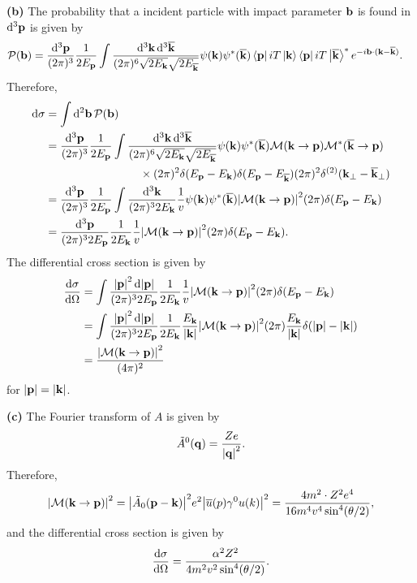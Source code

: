\documentclass{article}
\makeatletter
\newcommand*{\shifttext}[1]{%
  \settowidth{\@tempdima}{#1}%
  \hspace{-\@tempdima}#1%
}
\newcommand{\plabel}[1]{%
\shifttext{\textbf{#1}\quad}%
}
\makeatother
\begin{document}
\plabel{(b)}%
The probability that a incident particle with impact parameter $\vb{b}$ is found in $\dd[3]{\vb{p}}$ is given by
\begin{align*}
    \mathcal{P}(\vb{b}) &= \frac{\dd[3]{\vb{p}}}{(2\pi)^3} \frac{1}{2E_{\vb{p}}} \int \frac{\dd[3]{\vb{k}}\dd[3]{\overline{\vb{k}}}}{(2\pi)^6 \sqrt{2E_{\vb{k}}}\sqrt{2E_{\overline{\vb{k}}}}} \psi(\vb{k}) \psi^*(\overline{\vb{k}}) \bra{\vb{p}} iT \ket{\vb{k}} \bra{\vb{p}} iT \ket{\overline{\vb{k}}}^* e^{-i\vb{b}\cdot (\vb{k} - \overline{\vb{k}})}. 
\end{align*}
Therefore,
\begin{align*}
    \dd{\sigma} &= \int \dd[2]{\vb{b}} \mathcal{P}(\vb{b}) \\
    &= \frac{\dd[3]{\vb{p}}}{(2\pi)^3} \frac{1}{2E_{\vb{p}}} \int \frac{\dd[3]{\vb{k}}\dd[3]{\overline{\vb{k}}}}{(2\pi)^6 \sqrt{2E_{\vb{k}}}\sqrt{2E_{\overline{\vb{k}}}}} \psi(\vb{k}) \psi^*(\overline{\vb{k}}) \mathcal{M}(\vb{k}\rightarrow \vb{p}) \mathcal{M}^*(\overline{\vb{k}}\rightarrow \vb{p}) \\
    &\phantom{{}={}} \hspace{7em} \times (2\pi)^2 \delta(E_{\vb{p}} - E_{\vb{k}}) \delta(E_{\vb{p}} - E_{\overline{\vb{k}}}) (2\pi)^2 \delta^{(2)}(\vb{k}_\perp - \overline{\vb{k}}_\perp) \\
    &= \frac{\dd[3]{\vb{p}}}{(2\pi)^3} \frac{1}{2E_{\vb{p}}} \int \frac{\dd[3]{\vb{k}}}{(2\pi)^3 2 E_{\vb{k}}} \frac{1}{v} \psi(\vb{k}) \psi^*(\overline{\vb{k}}) \abs{\mathcal{M}(\vb{k}\rightarrow \vb{p})}^2 (2\pi) \delta(E_{\vb{p}} - E_{\vb{k}}) \\
    &= \frac{\dd[3]{\vb{p}}}{(2\pi)^3 2E_{\vb{p}}} \frac{1}{2E_{\vb{k}}} \frac{1}{v} \abs{\mathcal{M}(\vb{k}\rightarrow \vb{p})}^2 (2\pi) \delta(E_{\vb{p}} - E_{\vb{k}}).
\end{align*}
The differential cross section is given by
\begin{align*}
    \dv{\sigma}{\Omega} &= \int \frac{\abs{\vb{p}}^2 \dd{\abs{\vb{p}}}}{(2\pi)^3 2E_{\vb{p}}} \frac{1}{2E_{\vb{k}}} \frac{1}{v} \abs{\mathcal{M}(\vb{k}\rightarrow \vb{p})}^2 (2\pi) \delta(E_{\vb{p}} - E_{\vb{k}}) \\
    &= \int \frac{\abs{\vb{p}}^2 \dd{\abs{\vb{p}}}}{(2\pi)^3 2E_{\vb{p}}} \frac{1}{2E_{\vb{k}}} \frac{E_{\vb{k}}}{\abs{\vb{k}}} \abs{\mathcal{M}(\vb{k}\rightarrow \vb{p})}^2 (2\pi) \frac{E_{\vb{k}}}{\abs{\vb{k}}} \delta(\abs{\vb{p}} - \abs{\vb{k}}) \\
    &= \frac{\abs{\mathcal{M}(\vb{k}\rightarrow\vb{p})}^2}{(4\pi)^2}
\end{align*}
for $\abs{\vb{p}} = \abs{\vb{k}}$.

\plabel{(c)}%
The Fourier transform of $A$ is given by
\[ \tilde{A}^0(\vb{q}) = \frac{Z e}{\abs{\vb{q}}^2}. \]
Therefore,
\[ \abs{\mathcal{M}(\vb{k}\rightarrow\vb{p})}^2 = \abs{\tilde{A}_0(\vb{p} - \vb{k})}^2 e^2 \abs{\overline{u}(p) \gamma^0 u(k)}^2 = \frac{4m^2\cdot Z^2 e^4}{16m^4 v^4 \sin^4(\theta/2)}, \]
and the differential cross section is given by
\[ \dv{\sigma}{\Omega} = \frac{\alpha^2 Z^2}{4m^2 v^2 \sin^4(\theta/2)}. \]
\end{document}
